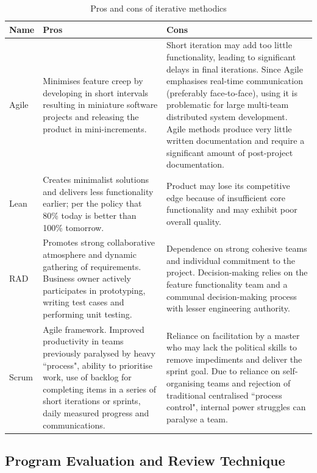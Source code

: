 \begin{longtable}{|p{}|p{}|p{}|}
\caption{Pros and cons of iterative methodics}\label{tab:prosconsitmet} \\
	\hline
	\textbf{Name} & \textbf{Pros} & \textbf{Cons} \\
	\hline
	\endhead
	Agile 
	& Minimises feature creep by developing in short intervals resulting in miniature software projects and releasing the product in mini-increments. 
	& Short iteration may add too little functionality, leading to significant delays in final iterations. Since Agile emphasises real-time communication (preferably face-to-face), using it is problematic for large multi-team distributed system development. Agile methods produce very little written documentation and require a significant amount of post-project documentation. \\
	\hline
	Lean 
	& Creates minimalist solutions and delivers less functionality earlier; per the policy that 80\% today is better than 100\% tomorrow. 
	& Product may lose its competitive edge because of insufficient core functionality and may exhibit poor overall quality. \\
	\hline
	RAD 
	& Promotes strong collaborative atmosphere and dynamic gathering of requirements. Business owner actively participates in prototyping, writing test cases and performing unit testing. 
	& Dependence on strong cohesive teams and individual commitment to the project. Decision-making relies on the feature functionality team and a communal decision-making process with lesser engineering authority. \\
	\hline
	Scrum 
	& Agile framework. Improved productivity in teams previously paralysed by heavy ``process", ability to prioritise work, use of backlog for completing items in a series of short iterations or sprints, daily measured progress and communications. 
	& Reliance on facilitation by a master who may lack the political skills to remove impediments and deliver the sprint goal. Due to reliance on self-organising teams and rejection of traditional centralised ``process control", internal power struggles can paralyse a team. \\
	\hline
\end{longtable}

\subsection{Program Evaluation and Review Technique}
\label{sec:pert}

